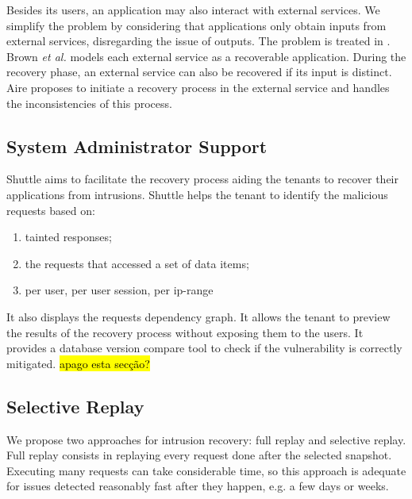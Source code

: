 Besides its users, an application may also interact with external services. We simplify the problem by considering that applications only obtain inputs from external services, disregarding the issue of outputs. The problem is treated in \cite{undoForOperators,aire}. Brown \textit{et al.} \cite{Brown_spheres} models each external service as a recoverable application. During the recovery phase, an external service can also be recovered if its input is distinct. Aire \cite{aire} proposes to initiate a recovery process in the external service and handles the inconsistencies of this process.


\subsection{System Administrator Support}
\label{sec:arch:system_admin_support}

Shuttle aims to facilitate the recovery process aiding the tenants to recover their applications from intrusions. Shuttle helps the tenant to identify the malicious requests based on: 
\begin{enumerate}
\item tainted responses;
\item the requests that accessed a set of data items;
\item per user, per user session, per ip-range
\end{enumerate}

 It also displays the requests dependency graph. It allows the tenant to preview the results of the recovery process without exposing them to the users. It provides a database version compare tool to check if the vulnerability is correctly mitigated.
\hl{apago esta secção?}

\subsection{Selective Replay}
\label{sec:arch:selective_replay}

We propose two approaches for intrusion recovery: full replay and selective replay. Full replay consists in replaying every request done after the selected snapshot. Executing many requests can take considerable time, so this approach is adequate for issues detected reasonably fast after they happen, e.g. a few days or weeks.

